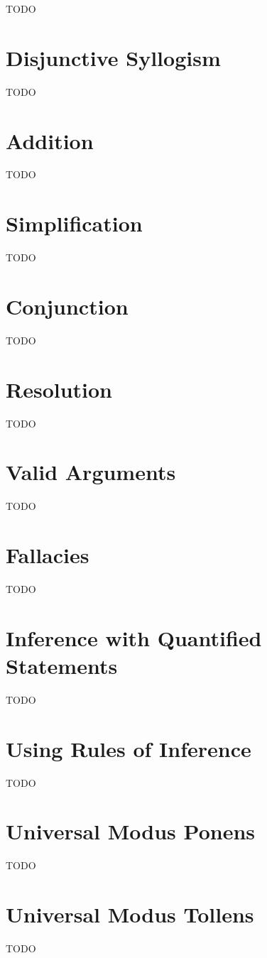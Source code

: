 \documentclass{article}
\begin{document}
TODO

\section{Disjunctive Syllogism}

TODO

\section{Addition}

TODO

\section{Simplification}

TODO

\section{Conjunction}
TODO

\section{Resolution}

TODO

\section{Valid Arguments}
TODO

\section{Fallacies}
TODO

\section{Inference with Quantified Statements}
TODO

\section{Using Rules of Inference}
TODO

\section{Universal Modus Ponens}
TODO

\section{Universal Modus Tollens}
TODO
\end{document}

